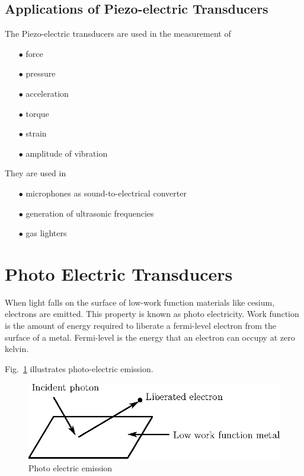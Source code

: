 \eject

\subsection{Applications of Piezo-electric Transducers}\label{sec8.14.2}

The Piezo-electric transducers are used in the measurement of
\begin{itemize}
\itemsep=0pt
\item[$\bullet$] force

\item[$\bullet$] pressure

\item[$\bullet$] acceleration

\item[$\bullet$] torque

\item[$\bullet$] strain

\item[$\bullet$] amplitude of vibration
\end{itemize}
They are used in
\begin{itemize}
\item[$\bullet$] microphones as sound-to-electrical converter 

\item[$\bullet$] generation of ultrasonic frequencies

\item[$\bullet$] gas lighters
\end{itemize}

\section{Photo Electric Transducers}\label{sec8.15}

When light falls on the surface of low-work function materials like cesium, electrons are emitted. This property is known as photo electricity. Work function is the amount of energy required to liberate a fermi-level electron from the surface of a metal. Fermi-level is the energy that an electron can occupy at zero kelvin.

Fig.~\ref{fig8.24} illustrates photo-electric emission. 
\begin{figure}[H]
\centering
\includegraphics{chap8/fig8.24.eps}
\caption{Photo electric emission}\label{fig8.24}
\end{figure}

